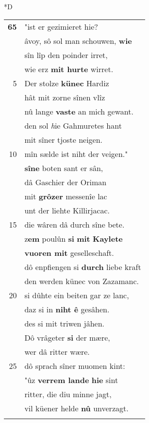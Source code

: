 \documentclass[8pt,a4paper,notitlepage]{article}
\begin{document}
\begin{table}[ht]
\begin{minipage}[t]{0.5\linewidth}
\small
\begin{center}*D
\end{center}
\begin{tabular}{rl}
\textbf{65} & "ist er gezimieret hie?\\ 
 & âvoy, sô sol man schouwen, \textbf{wie}\\ 
 & sîn lîp den poinder irret,\\ 
 & wie erz \textbf{mit hurte} wirret.\\ 
5 & Der stolze \textbf{künec} Hardiz\\ 
 & hât mit zorne sînen vlîz\\ 
 & nû lange \textbf{vaste} an mich gewant.\\ 
 & den sol \textit{h}ie Gahmuretes hant\\ 
 & mit sîner tjoste neigen.\\ 
10 & mîn sælde ist niht der veigen."\\ 
 & \textbf{sîne} boten sant er sân,\\ 
 & dâ Gaschier der Oriman\\ 
 & mit \textbf{grôzer} messenîe lac\\ 
 & unt der liehte Killirjacac.\\ 
15 & die wâren dâ durch sîne bete.\\ 
 & z\textbf{em} poulûn \textbf{si} \textbf{mit} \textbf{Kaylete}\\ 
 & \textbf{vuoren mit} geselleschaft.\\ 
 & dô enpfiengen si \textbf{durch} liebe kraft\\ 
 & den werden künec von Zazamanc.\\ 
20 & si dûhte ein beiten gar ze lanc,\\ 
 & daz si in \textbf{niht ê} gesâhen.\\ 
 & des si mit triwen jâhen.\\ 
 & Dô vrâgeter \textbf{si} der mære,\\ 
 & wer dâ ritter wære.\\ 
25 & dô sprach sîner muomen kint:\\ 
 & "ûz \textbf{verrem lande} \textbf{hie} sint\\ 
 & ritter, die diu minne jagt,\\ 
 & vil küener helde \textbf{nû} unverzagt.\\ 
 & \textit{\begin{large}H\end{large}}ie hât manegen Bertun\\ 

\end{tabular}
\end{minipage}
\end{table}
\end{document}
